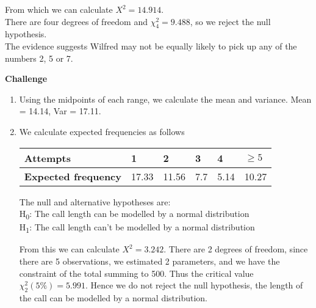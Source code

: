 \documentclass[fleqn]{article}
\begin{document}
\begin{enumerate}
\begin{enumerate}[label=\bfseries \alph*\space ]
                From which we can calculate $X^2=14.914$. \\
                There are four degrees of freedom and $\chi_4^2=9.488$, so we reject the null hypothesis. \\
                The evidence suggests Wilfred may not be equally likely to pick up any of the numbers 2, 5 or 7.
        \end{enumerate}
\end{enumerate}

\newpage
\textbf{Challenge}
\begin{enumerate}[label=\bfseries \alph*\space ]
    \item Using the midpoints of each range, we calculate the mean and variance. Mean = 14.14, Var = 17.11.
    \item We calculate expected frequencies as follows \vspace{1mm}\\
        \begin{tabularx}{0.65\textwidth}{|X|*5{P{12mm}|}}
            \hline
            \textbf{Attempts}             & 1     & 2     & 3   & 4    & $\geq5$     \\\hline
            \textbf{Expected frequency}   & 17.33 & 11.56 & 7.7 & 5.14 & 10.27       \\\hline
        \end{tabularx}\vspace{4mm}
        
        The null and alternative hypotheses are:\\
        H\textsubscript{0}: The call length can be modelled by a normal distribution \\
        H\textsubscript{1}: The call length can't be modelled by a normal distribution 
        
        From this we can calculate $X^2=3.242$. There are 2 degrees of freedom, since there are 5 observations, we estimated 2 parameters, and we have the constraint of the total summing to 500. Thus the critical value $\chi_2^2(5\%)=5.991$. Hence we do not reject the null hypothesis, the length of the call can be modelled by a normal distribution.  
\end{enumerate}
\end{document}
